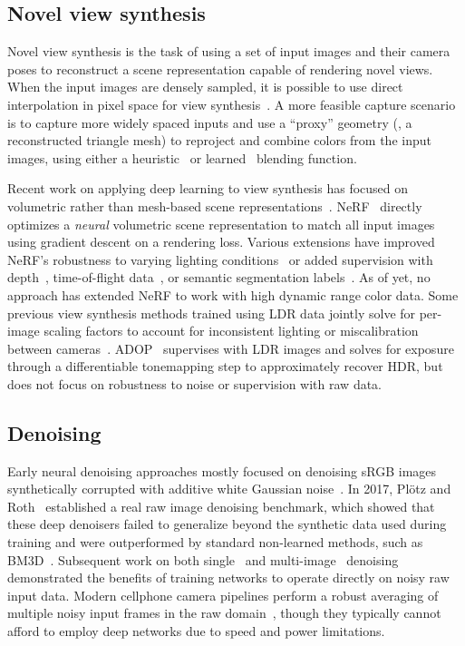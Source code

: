 \subsection{Novel view synthesis}

Novel view synthesis is the task of using a set of input images and their camera poses to reconstruct a scene representation capable of rendering novel views. When the input images are densely sampled, it is possible to use direct interpolation in pixel space for view synthesis~\cite{levoy96lightfields,cohen96lumigraph}. A more feasible capture scenario is to capture more widely spaced inputs and use a ``proxy'' geometry (\eg, a reconstructed triangle mesh) to reproject and combine colors from the input images, using either a heuristic~\cite{buehler01unstructlumigraph} or learned~\cite{hedman2018deepblending,riegler2020fvs,riegler2021svs} blending function.

Recent work on applying deep learning to view synthesis has focused on volumetric rather than mesh-based scene representations~\cite{flynn2016deepstereo,zhou18stereomag,lombardi2019neuralvolumes}. 
NeRF~\cite{mildenhall2020nerf} directly optimizes a \emph{neural} volumetric scene representation to match all input images using gradient descent on a rendering loss. 
Various extensions have improved NeRF's robustness to varying lighting conditions~\cite{martinbrualla2020nerfw} or added supervision with  depth~\cite{wei2021nerfingmvs,jeong2021scnerf,kangle2021dsnerf}, time-of-flight data~\cite{attal2021torf}, or semantic segmentation labels~\cite{zhi2021semanticnerf}. As of yet, no approach has extended NeRF to work with high dynamic range color data.
Some previous view synthesis methods trained using LDR data jointly solve for per-image scaling factors to account for inconsistent lighting or miscalibration between cameras~\cite{lombardi2019neuralvolumes,kopanas2021pbr}.
ADOP~\cite{ruckert2021adop} supervises with LDR images and solves for exposure through a differentiable tonemapping step to approximately recover HDR, but does not focus on robustness to noise or supervision with raw data.



\subsection{Denoising}


Early neural denoising approaches mostly focused on denoising sRGB images synthetically corrupted with additive white Gaussian noise~\cite{zhang2017beyond}. In 2017, Pl\"otz and Roth~\cite{plotz2017cvpr} established a real raw image denoising benchmark, which showed that these deep denoisers failed to generalize beyond the synthetic data used during training and were outperformed by standard non-learned methods, such as BM3D~\cite{bm3d}. Subsequent work on both single~\cite{chen2018cvpr,brooks2019cvpr} and multi-image~\cite{kpn,godard2018burst,chen2019iccv,rvidenet} denoising demonstrated the benefits of training networks to operate directly on noisy raw input data. Modern cellphone camera pipelines perform a robust averaging of multiple noisy input frames in the raw domain~\cite{hdrplus}, though they typically cannot afford to employ deep networks due to speed and power limitations. 

